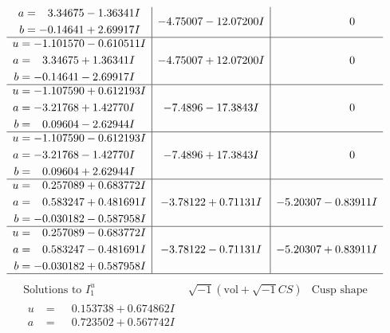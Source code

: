 \documentclass[1p]{elsarticle_modified}
\theoremstyle{definition}
\newcommand{\I}{\sqrt{-1}}
\begin{document}
$$\begin{array}{c|c|c}
\begin{aligned}
a &= \phantom{-}3.34675 - 1.36341 I \\
b &= -0.14641 + 2.69917 I\end{aligned}
 & -4.75007 - 12.07200 I & \phantom{-0.000000 } 0 \\ \hline\begin{aligned}
u &= -1.101570 - 0.610511 I \\
a &= \phantom{-}3.34675 + 1.36341 I \\
b &= -0.14641 - 2.69917 I\end{aligned}
 & -4.75007 + 12.07200 I & \phantom{-0.000000 } 0 \\ \hline\begin{aligned}
u &= -1.107590 + 0.612193 I \\
a &= -3.21768 + 1.42770 I \\
b &= \phantom{-}0.09604 - 2.62944 I\end{aligned}
 & -7.4896 - 17.3843 I & \phantom{-0.000000 } 0 \\ \hline\begin{aligned}
u &= -1.107590 - 0.612193 I \\
a &= -3.21768 - 1.42770 I \\
b &= \phantom{-}0.09604 + 2.62944 I\end{aligned}
 & -7.4896 + 17.3843 I & \phantom{-0.000000 } 0 \\ \hline\begin{aligned}
u &= \phantom{-}0.257089 + 0.683772 I \\
a &= \phantom{-}0.583247 + 0.481691 I \\
b &= -0.030182 - 0.587958 I\end{aligned}
 & -3.78122 + 0.71131 I & -5.20307 - 0.83911 I \\ \hline\begin{aligned}
u &= \phantom{-}0.257089 - 0.683772 I \\
a &= \phantom{-}0.583247 - 0.481691 I \\
b &= -0.030182 + 0.587958 I\end{aligned}
 & -3.78122 - 0.71131 I & -5.20307 + 0.83911 I\\
 \hline 
 \end{array}$$\newpage$$\begin{array}{c|c|c}  
\text{Solutions to }I^u_{1}& \I (\text{vol} + \sqrt{-1}CS) & \text{Cusp shape}\\
 \hline 
\begin{aligned}
u &= \phantom{-}0.153738 + 0.674862 I \\
a &= \phantom{-}0.723502 + 0.567742 I \\

\end{aligned}
\end{array}$$
\end{document}
